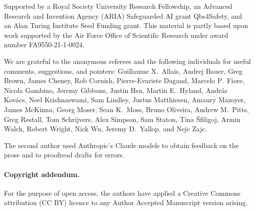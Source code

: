 \documentclass[acmsmall,screen]{acmart}
\begin{document}
\pagebreak
\begin{acks}
  Supported by a Royal Society University Research Fellowship, an Advanced
  Research and Invention Agency (ARIA) Safeguarded AI grant
  Qbs4Safety, and an Alan Turing Institute Seed Funding grant.
%
  This material is partly based upon work supported by the Air Force
  Office of Scientific Research under award number FA9550-21-1-0024.

  We are grateful to the anonymous referees and
  the following individuals for useful comments,
  suggestions, and pointers:
Guillaume X.~Allais,
Andrej Bauer,
Greg Brown,
James Cheney,
Rob Cornish,
Pierre-Evariste Dagand,
Marcelo P.~Fiore,
Nicola Gambino,
Jeremy Gibbons,
Justin Hsu,
Martin E.~Hyland,
Andr\'as Kov\'acs,
Neel Krishnaswami,
Sam Lindley,
Justus Matthiesen,
Amaury Mazoyer,
James McKinna,
Georg Moser,
Sean K.~Moss,
Bruno Oliveira,
Andrew M.~Pitts,
Greg Restall,
Tom Schrijvers,
Alex Simpson,
Sam Staton,
Tina Šfiligoj,
Armin Walch,
Robert Wright,
Nick Wu,
Jeremy D.~Yallop, and
Nejc Zajc.

The second author
used Anthropic's Claude models to obtain feedback on the prose and to
proofread drafts for errors.
%
\paragraph{Copyright addendum.}
  For the purpose of open access, the authors have applied a Creative
  Commons attribution (CC BY) licence to any Author Accepted
  Manuscript version arising.
\end{acks}





\newpage
{}
\end{document}
